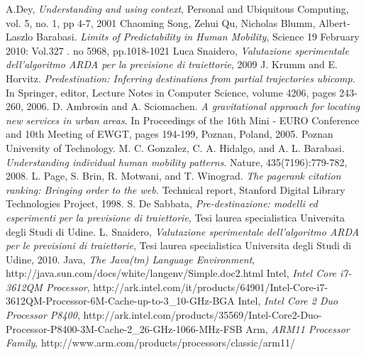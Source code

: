 \begin{thebibliography}{999}
 A.Dey, \textit{Understanding and using context}, Personal and Ubiquitous Computing, vol. 5, no. 1, pp 4-7, 2001
 Chaoming Song, Zehui Qu, Nicholas Blumm, Albert-Laszlo Barabasi. \textit{Limits of Predictability in Human Mobility}, Science 19 February 2010: Vol.327 . no 5968, pp.1018-1021
 Luca Snaidero, \textit{Valutazione sperimentale dell'algoritmo ARDA per la previsione di traiettorie}, 2009
 J. Krumm and E. Horvitz. \textit{Predestination: Inferring destinations from partial trajectories ubicomp.} In Springer, editor, Lecture Notes in Computer Science, volume 4206, pages 243-260, 2006.
 D. Ambrosin and A. Sciomachen. \textit{A gravitational approach for locating new services in urban areas}. In Proceedings of the 16th Mini - EURO Conference and 10th Meeting of EWGT, pages 194-199, Poznan, Poland, 2005. Poznan University of Technology.
 M. C. Gonzalez, C. A. Hidalgo, and A. L. Barabasi. \textit{Understanding individual human mobility patterns}. Nature, 435(7196):779-782, 2008.
 L. Page, S. Brin, R. Motwani, and T. Winograd. \textit{The pagerank citation ranking: Bringing order to the web.} Technical report, Stanford Digital Library Technologies Project, 1998.
 S. De Sabbata, \textit{Pre-destinazione: modelli ed esperimenti per la previsione di traiettorie}, Tesi laurea specialistica Universita degli Studi di Udine.
 L. Snaidero, \textit{Valutazione sperimentale dell'algoritmo ARDA per le previsioni di traiettorie}, Tesi laurea specialistica Universita degli Studi di Udine, 2010.
 Java, \textit{The Java(tm) Language Environment}, http://java.sun.com/docs/white/langenv/Simple.doc2.html
 Intel, \textit{Intel Core i7-3612QM Processor}, http://ark.intel.com/it/products/64901/Intel-Core-i7-3612QM-Processor-6M-Cache-up-to-3\_10-GHz-BGA
 Intel, \textit{Intel Core 2 Duo Processor P8400}, http://ark.intel.com/products/35569/Intel-Core2-Duo-Processor-P8400-3M-Cache-2\_26-GHz-1066-MHz-FSB
 Arm, \textit{ARM11 Processor Family}, http://www.arm.com/products/processors/classic/arm11/
\end{thebibliography}
